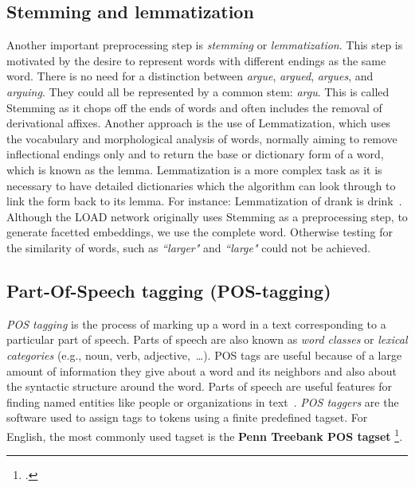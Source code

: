 \subsection{Stemming and  lemmatization}
Another important preprocessing step is \emph{stemming} or \emph{lemmatization}. This step is motivated by the desire to represent words with different endings as the same word. There is no need for a distinction between \emph{argue}, \emph{argued}, \emph{argues}, and \emph{arguing}. They could all be represented by a common stem: \emph{argu}. This is called Stemming as it chops off the ends of words and often includes the removal of derivational affixes. Another approach is the use of Lemmatization, which uses the vocabulary and morphological analysis of words, normally aiming to remove inflectional endings only and to return the base or dictionary form of a word, which is known as the lemma. Lemmatization is a more complex task as it is necessary to have detailed dictionaries which the algorithm can look through to link the form back to its lemma. For instance:
Lemmatization of drank is drink~. Although the LOAD network originally uses Stemming as a preprocessing step, to generate facetted embeddings, we use the complete word. Otherwise testing for the similarity of words, such as \emph{``larger"} and \emph{``large"} could not be achieved. 
\subsection{Part-Of-Speech tagging (POS-tagging)}
\emph{POS tagging} is the process of marking up a word in a text corresponding to a particular part of speech. Parts of speech are also known as \emph{word classes} or \emph{lexical categories} (e.g., noun, verb, adjective,~\dots). POS tags are useful because of a large amount of information they give about a word and its neighbors and also about the syntactic structure around the word. Parts of speech are useful features for finding named entities like people or organizations in text~. \emph{POS taggers} are the software used to assign tags to tokens using a finite predefined tagset. For English, the most commonly used tagset is the \textbf{Penn Treebank POS tagset} \footcite{https://www.ling.upenn.edu/courses/Fall_2003/ling001/penn_treebank_pos.html}. 
